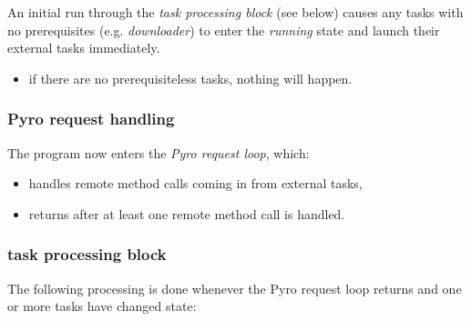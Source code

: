 \documentclass[a4paper,12pt]{amsart}
\begin{document}
An initial run through the {\em task processing block} (see below)
causes any tasks with no prerequisites (e.g. {\em downloader}) to enter the
{\em running} state and launch their external tasks immediately.
    \begin{itemize}
    \item if there are no prerequisiteless tasks, nothing will happen.
    \end{itemize}

\subsubsection{Pyro request handling}

The program now enters the {\em Pyro request loop}, which:

    \begin{itemize}
    \item handles remote method calls coming in from external tasks, 
    \item returns after at least one remote method call is handled. 
    \end{itemize}

\subsubsection{task processing block} 

The following processing is done whenever the Pyro request loop returns
and one or more tasks have changed state: 
\end{document}

